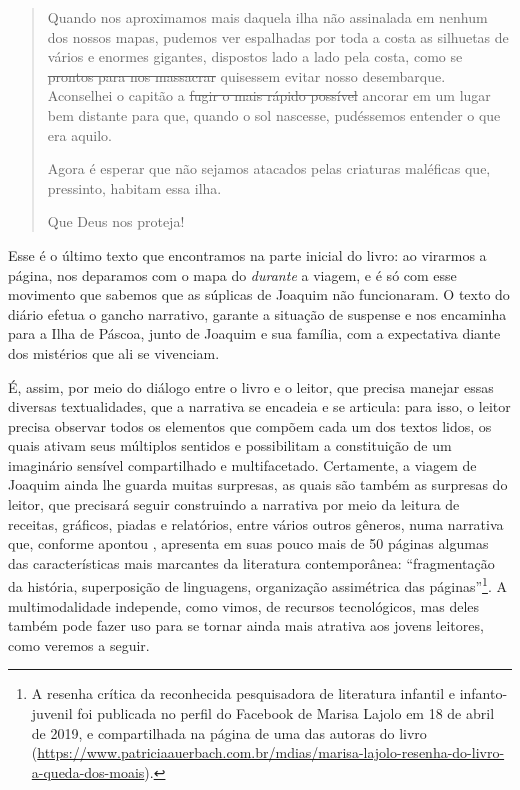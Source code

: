 \documentclass[portuguese]{textolivre}
\begin{document}
\begin{minipage}{\textwidth}
\begin{quote}
Quando nos aproximamos mais daquela ilha não assinalada em nenhum dos
nossos mapas, pudemos ver espalhadas por toda a costa as silhuetas de
vários e enormes gigantes, dispostos lado a lado pela costa, como se
\st{prontos para nos massacrar} quisessem evitar nosso desembarque.
Aconselhei o capitão a \st{fugir o mais rápido possível} ancorar em um
lugar bem distante para que, quando o sol nascesse, pudéssemos entender o
que era aquilo.

Agora é esperar que não sejamos atacados pelas criaturas maléficas que,
pressinto, habitam essa ilha.

Que Deus nos proteja! \cite[p.~15, tachados do original]{franco_queda_2018}
\end{quote}
\vspace{1em}
\end{minipage}



Esse é o último texto que encontramos na parte inicial do livro: ao virarmos a
página, nos deparamos com o mapa do \textit{durante} a viagem, e é só com esse
movimento que sabemos que as súplicas de Joaquim não funcionaram. O texto do
diário efetua o gancho narrativo, garante a situação de suspense e nos
encaminha para a Ilha de Páscoa, junto de Joaquim e sua família, com a
expectativa diante dos mistérios que ali se vivenciam. 

É, assim, por meio do diálogo entre o livro e o leitor, que precisa manejar
essas diversas textualidades, que a narrativa se encadeia e se articula: para
isso, o leitor precisa observar todos os elementos que compõem cada um dos
textos lidos, os quais ativam seus múltiplos sentidos e possibilitam a
constituição de um imaginário sensível compartilhado e multifacetado.
Certamente, a viagem de Joaquim ainda lhe guarda muitas surpresas, as quais são
também as surpresas do leitor, que precisará seguir construindo a narrativa por
meio da leitura de receitas, gráficos, piadas e relatórios, entre vários outros
gêneros, numa narrativa que, conforme apontou \textcite{lajolo_resenha_2019},
apresenta em suas pouco mais de 50 páginas algumas das características mais
marcantes da literatura contemporânea: “fragmentação da história, superposição
de linguagens, organização assimétrica das páginas”\footnote{A resenha crítica
da reconhecida pesquisadora de literatura infantil e infanto-juvenil foi
publicada no perfil do Facebook de Marisa Lajolo em 18 de abril de 2019, e
compartilhada na página de uma das autoras do livro
(\url{https://www.patriciaauerbach.com.br/mdias/marisa-lajolo-resenha-do-livro-a-queda-dos-moais}).}.
A multimodalidade independe, como vimos, de recursos tecnológicos, mas deles
também pode fazer uso para se tornar ainda mais atrativa aos jovens leitores,
como veremos a seguir.
\end{document}
